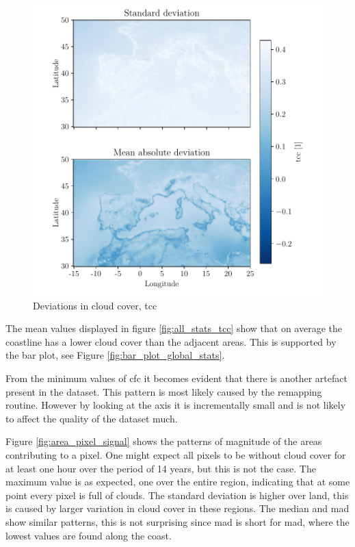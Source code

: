 \begin{figure}
    \centering
    \includegraphics{python_figs/DEVIATION_all_stat_variable_tcc.pdf}
    \caption{Deviations in cloud cover, tcc}
    \label{fig:deviation_tcc}
\end{figure}


The mean values displayed in figure \ref{fig:all_stats_tcc} show that on average the coastline has a lower cloud cover than the adjacent areas. This is supported by the bar plot, see Figure \ref{fig:bar_plot_global_stats}. 

From the minimum values of \acrshort{cfc} it becomes evident that there is another artefact present in the dataset. This pattern is most likely caused by the remapping routine. However by looking at the axis it is incrementally small and is not likely to affect the quality of the dataset much.

Figure \ref{fig:area_pixel_signal} shows the patterns of magnitude of the areas contributing to a pixel. One might expect all pixels to be without cloud cover for at least one hour over the period of 14 years, but this is not the case. The maximum value is as expected, one over the entire region, indicating that at some point every pixel is full of clouds. The standard deviation is higher over land, this is caused by larger variation in cloud cover in these regions. The median and \acrshort{mad} 
show similar patterns, this is not surprising since \acrshort{mad} is short for \acrlong{mad}, where the lowest values are found along the coast.

